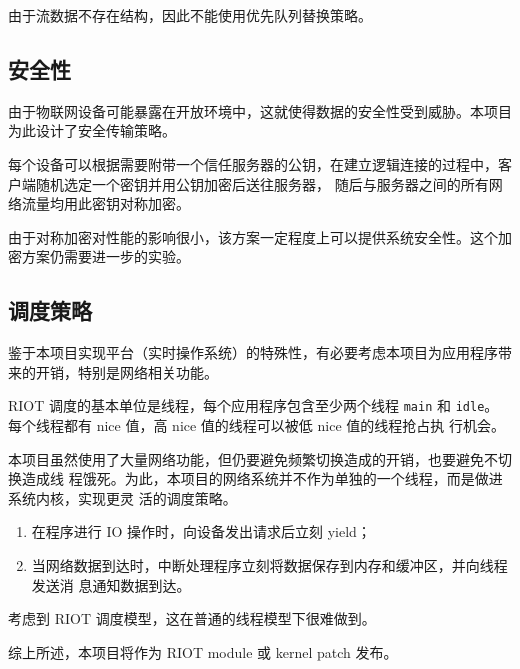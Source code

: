 \documentclass{ctexart}
\begin{document}
由于流数据不存在结构，因此不能使用优先队列替换策略。

\subsection{安全性}
\label{design-security}
由于物联网设备可能暴露在开放环境中，这就使得数据的安全性受到威胁。本项目为此设计了安全传输策略。

每个设备可以根据需要附带一个信任服务器的公钥，在建立逻辑连接的过程中，客户端随机选定一个密钥并用公钥加密后送往服务器，
随后与服务器之间的所有网络流量均用此密钥对称加密。

由于对称加密对性能的影响很小，该方案一定程度上可以提供系统安全性。这个加密方案仍需要进一步的实验。

\subsection{调度策略}
鉴于本项目实现平台（实时操作系统）的特殊性，有必要考虑本项目为应用程序带来的开销，特别是网络相关功能。

RIOT 调度的基本单位是线程，每个应用程序包含至少两个线程 \verb|main| 和
\verb|idle|。每个线程都有 nice 值，高 nice 值的线程可以被低 nice 值的线程抢占执
行机会。

本项目虽然使用了大量网络功能，但仍要避免频繁切换造成的开销，也要避免不切换造成线
程饿死。为此，本项目的网络系统并不作为单独的一个线程，而是做进系统内核，实现更灵
活的调度策略。
\begin{enumerate}
\item 在程序进行 IO 操作时，向设备发出请求后立刻 yield；
\item 当网络数据到达时，中断处理程序立刻将数据保存到内存和缓冲区，并向线程发送消
  息通知数据到达。
\end{enumerate}
考虑到 RIOT 调度模型，这在普通的线程模型下很难做到。

综上所述，本项目将作为 RIOT module 或 kernel patch 发布。
\end{document}
